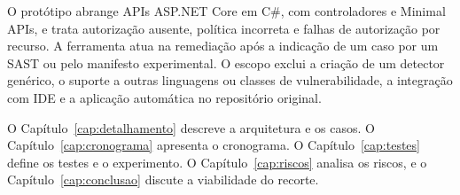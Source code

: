 O protótipo abrange APIs ASP.NET Core em C\#, com controladores e Minimal APIs, e trata autorização ausente, política incorreta e falhas de autorização por recurso. A ferramenta atua na remediação após a indicação de um caso por um SAST ou pelo manifesto experimental. O escopo exclui a criação de um detector genérico, o suporte a outras linguagens ou classes de vulnerabilidade, a integração com IDE e a aplicação automática no repositório original.

O Capítulo~\ref{cap:detalhamento} descreve a arquitetura e os casos. O Capítulo~\ref{cap:cronograma} apresenta o cronograma. O Capítulo~\ref{cap:testes} define os testes e o experimento. O Capítulo~\ref{cap:riscos} analisa os riscos, e o Capítulo~\ref{cap:conclusao} discute a viabilidade do recorte.
